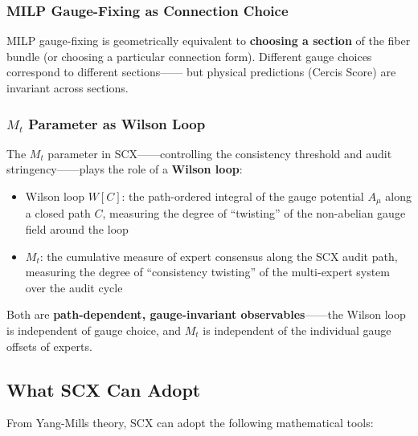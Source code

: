 \documentclass[12pt,a4paper]{article}
\theoremstyle{remark}
\begin{document}
\subsubsection{MILP Gauge-Fixing as Connection Choice}

MILP gauge-fixing is geometrically equivalent to \textbf{choosing a section} of the fiber
bundle (or choosing a particular connection form). Different gauge choices correspond to different sections——
but physical predictions (Cercis Score) are invariant across sections.

\subsubsection{$M_t$ Parameter as Wilson Loop}

The $M_t$ parameter in SCX——controlling the consistency threshold and
audit stringency——plays the role of a \textbf{Wilson loop}:
\begin{itemize}
    \item Wilson loop $W[C]$: the path-ordered integral of the gauge potential $A_\mu$ along a closed path $C$,
    measuring the degree of ``twisting'' of the non-abelian gauge field around the loop
    \item $M_t$: the cumulative measure of expert consensus along the SCX audit path, measuring the degree of
    ``consistency twisting'' of the multi-expert system over the audit cycle
\end{itemize}

Both are \textbf{path-dependent, gauge-invariant observables}——the Wilson loop is independent of gauge choice,
and $M_t$ is independent of the individual gauge offsets of experts.

\subsection{What SCX Can Adopt}

From Yang-Mills theory, SCX can adopt the following mathematical tools:
\end{document}
